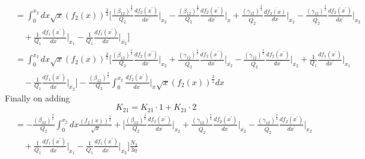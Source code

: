 \documentclass[fleqn, 10pt]{article}
\begin{document}
\begin{equation*}
\begin{split}
  & = \int^{x_{2}}_{0} dx \sqrt{x} (f_{2}(x))^\frac{3}{2} \biggl[ \frac{(\beta_{12})^\frac{3}{2}}{Q_{2}} \frac{df_{2}(x^\prime)}{dx^\prime}\biggr|_{x_{2}} - \frac{(\beta_{12})^\frac{3}{2}}{Q_{2}} \frac{df_{2}(x^\prime)}{dx^\prime}\biggr|_{x} + \frac{(\gamma_{1\overline{2}})^\frac{3}{2}}{\overline{Q_{2}}} \frac{d\overline{f_{2}(x)}}{dx}\biggr|_{\overline{x_{2}}} - \frac{(\gamma_{1\overline{2}})^\frac{3}{2}}{\overline{Q_{2}}} \frac{d\overline{f_{2}(x^\prime)}}{dx^\prime} \biggr|_{x_{2}} \\ & \quad + \frac{1}{Q_{1}} \frac{df_{1}(x^\prime)}{dx^\prime} \biggr|_{x_{1}} - \frac{1}{Q_{1}} \frac{df_{1}(x^\prime)}{dx^\prime} \biggr|_{\overline{x_{2}}}     \biggr]
   \end{split}
   \end{equation*}
\begin{equation}
\begin{split}
   & = \int^{x_{2}}_{0} dx \sqrt{x}(f_{2}(x))^\frac{3}{2} \biggl[ \frac{(\beta_{12})^\frac{3}{2}}{Q_{2}} \frac{df_{2}(x^\prime)}{dx^\prime}\biggr|_{x_{2}} + \frac{(\gamma_{1\overline{2}})^\frac{3}{2}}{\overline{Q_{2}}} \frac{d\overline{f_{2}(x^\prime)}}{dx^\prime} \biggr|_{\overline{x_{2}}} - \frac{(\gamma_{1\overline{2}})^\frac{3}{2}}{\overline{Q_{2}}} \frac{d\overline{f_{2}(x^\prime)}}{dx^\prime} \biggr|_{x_{2}} + \frac{1}{Q_{1}} \frac{df_{1}(x^\prime)}{dx^\prime} \biggr|_{x_{1}} \\ & \quad - \frac{1}{Q_{1}} \frac{df_{1}(x^\prime)}{dx^\prime} \biggr|_{\overline{x_{2}}} \biggr]   - \frac{(\beta_{12})^\frac{3}{2}}{Q_{2}} \int^{x_{2}}_{0} \frac{df_{2}(x^\prime)}{dx^\prime}\biggr|_{x} \sqrt{x}(f_{2}(x))^\frac{3}{2}dx 
    \end{split}
\end{equation}
Finally on adding 
\begin{equation}
    K_{21} = K_{21}\cdot 1 + K_{21} \cdot 2
\end{equation}
\begin{equation*}
\begin{split}
   &  = - \frac{(\beta_{12})^\frac{3}{2}}{Q_{2}} \int^{x_{2}}_{0}dx \frac{(f_{2}(x))^\frac{5}{2}}{\sqrt{x}} + \biggl[  \frac{(\beta_{12})^\frac{3}{2}}{Q_{2}} \frac{df_{2}(x^\prime)}{dx^\prime} \biggr|_{x_{2}} + \frac{(\gamma_{1\overline{2}})^\frac{3}{2}}{\overline{Q_{2}}} \frac{d\overline{f_{2}(x^\prime)}}{dx^\prime} \biggr|_{\overline{x_{2}}} - \frac{(\gamma_{1\overline{2}})^\frac{3}{2}}{\overline{Q_{2}}} \frac{d\overline{f_{2}(x^\prime)}}{dx^\prime}\biggr|_{x_{2}} \\ & \quad + \frac{1}{Q_{1}} \frac{df_{1}(x^\prime)}{dx^\prime}\biggr|_{x_{1}} - \frac{1}{Q_{1}} \frac{df_{1}(x^\prime)}{dx^\prime} \biggr|_{\overline{x_{2}}}\biggr]\frac{N_{2}}{3\eta}
    \end{split}
\end{equation*}
\end{document}
